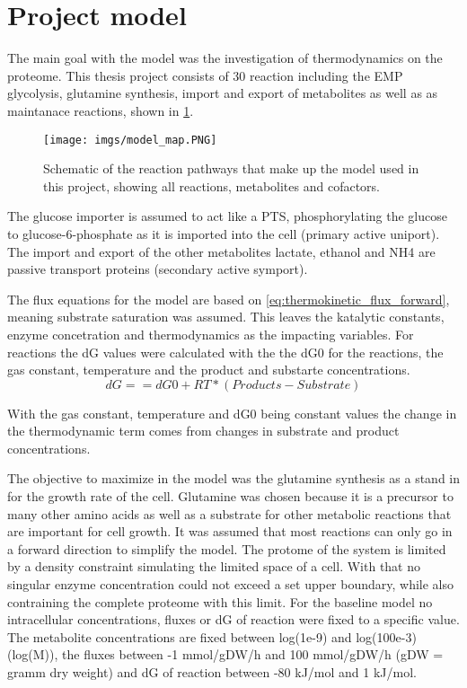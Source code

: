\section{Project model}
The main goal with the model was the investigation of thermodynamics on the proteome. 
This thesis project consists of 30 reaction including the EMP glycolysis, glutamine synthesis, import and export of metabolites as well as as maintanace reactions, shown in \ref{fig:model_map}. 
\begin{figure}[H]
    \centering
    \texttt{[image: imgs/model\_map.PNG]}
    \caption{Schematic of the reaction pathways that make up the model used in this project, showing all reactions, metabolites and cofactors.}
    \label{fig:model_map}
\end{figure}

The glucose importer is assumed to act like a PTS, phosphorylating the glucose to glucose-6-phosphate as it is imported into the cell (primary active uniport). The import and export of the other metabolites lactate, ethanol and NH4 are passive transport proteins (secondary active symport).

The flux equations for the model are based on \ref{eq:thermokinetic_flux_forward}, meaning substrate saturation was assumed. This leaves the katalytic constants, enzyme concetration and thermodynamics as the impacting variables.
For reactions the dG values were calculated with the the dG0 for the reactions, the gas constant, temperature and the product and substarte concentrations.
\begin{equation}
    dG == dG0 + RT * (Products - Substrate)
    \label{eq:general_dG}
\end{equation}

With the gas constant, temperature and dG0 being constant values the change in the thermodynamic term comes from changes in substrate and product concentrations. 

The objective to maximize in the model was the glutamine synthesis as a stand in for the growth rate of the cell. Glutamine was chosen because it is a precursor to many other amino acids as well as a substrate for other metabolic reactions that are important for cell growth.
It was assumed that most reactions can only go in a forward direction to simplify the model. 
The protome of the system is limited by a density constraint simulating the limited space of a cell. With that no singular enzyme concentration could not exceed a set upper boundary, while also contraining the complete proteome with this limit.
For the baseline model no intracellular concentrations, fluxes or dG of reaction were fixed to a specific value. The metabolite concentrations are fixed between log(1e-9) and log(100e-3) (log(M)), the fluxes between -1 mmol/gDW/h and 100 mmol/gDW/h (gDW = gramm dry weight) and dG of reaction between -80 kJ/mol and 1 kJ/mol. 

